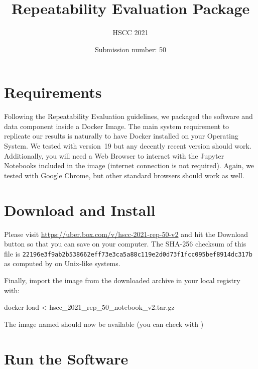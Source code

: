 \documentclass{uLatex}
\author{Submission number: 50}
\title{Repeatability Evaluation Package}
\subtitle{HSCC 2021}
\begin{document}
\maketitle[standard]

\section{Requirements}

Following the Repeatability Evaluation guidelines\cite{hscc2021-rer}, we packaged the software and data component inside a Docker Image. The main system requirement to replicate our results is naturally to have Docker installed\cite{get-docker} on your Operating System. We tested with version~19 but any decently recent version should work. Additionally, you will need a Web Browser to interact with the Jupyter Notebooks\cite{jupyter-notebook} included in the image (internet connection is not required). Again, we tested with Google Chrome\cite{google-chrome}, but other standard browsers should work as well.

\section{Download and Install}

Please visit \url{https://uber.box.com/v/hscc-2021-rep-50-v2} and hit the Download button so that you can save  on your computer. The SHA-256 checksum of this file  is \verb|22196e3f9ab2b538662eff73e3ca5a88c119e2d0d73f1fcc095bef8914dc317b| as computed by  on Unix-like systems.

\smallskip
Finally, import the image from the downloaded archive in your local registry with:
\begin{bashshell}
docker load < hscc_2021_rep_50_notebook_v2.tar.gz
\end{bashshell}

The image named  should now be available (you can check with )

\section{Run the Software}
\end{document}
